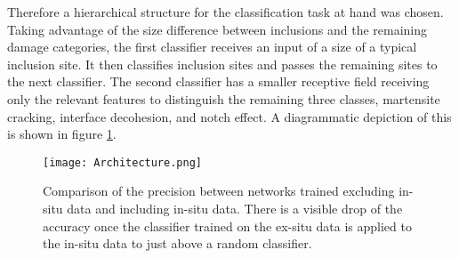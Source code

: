 Therefore a hierarchical structure for the classification task at hand was chosen. Taking advantage of the size difference between inclusions and the remaining damage categories, the first classifier receives an input of a size of a typical inclusion site. It then classifies inclusion sites and passes the remaining sites to the next classifier. The second classifier has a smaller receptive field receiving only the relevant features to distinguish the remaining three classes, martensite cracking, interface decohesion, and notch effect. A diagrammatic depiction of this is shown in figure \ref{fig:Architecture}.\\

%
%

\begin{figure}
\begin{center}
  \texttt{[image: Architecture.png]}
\caption{Comparison of the precision between networks trained excluding in-situ data and including in-situ data. There is a visible drop of the accuracy once the classifier trained on the ex-situ data is applied to the in-situ data to just above a random classifier.}
\label{fig:Architecture}
\end{center}
\end{figure}

